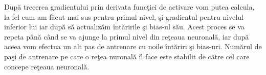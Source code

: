 \par

Dup\u{a} trecerea gradientului prin derivata func\c{t}iei de activare vom putea calcula, la fel cum am f\u{a}cut mai sus pentru primul nivel, \c{s}i gradientul pentru nivelul inferior lui iar dup\u{a} s\u{a} actualiz\u{a}m \^{i}nt\u{a}ririle \c{s}i bias-ul s\u{a}u. Acest proces se va repeta p\^{a}n\u{a} c\^{a}nd se va ajunge la primul nivel din re\c{t}eaua neuronal\u{a}, iar dup\u{a} aceea vom efectua un alt pas de antrenare cu noile \^{i}nt\u{a}riri \c{s}i bias-uri. Num\u{a}rul de pa\c{s}i de antrenare pe care o re\c{t}ea nuronal\u{a} \^{i}l face este stabilit de c\u{a}tre cel care concepe re\c{t}eaua neuronal\u{a}.